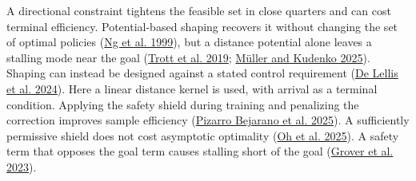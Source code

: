 \documentclass[10pt,letterpaper]{article}
\newcommand{\citl}[2]{(\hyperlink{ref:#1}{#2})}
\newcommand{\citm}[1]{(#1)}
\newcommand{\cl}[2]{\hyperlink{ref:#1}{#2}}
\begin{document}
A directional constraint tightens the feasible set in close quarters and can cost
terminal efficiency. Potential-based shaping recovers it without changing the set of
optimal policies \citl{ng1999}{Ng et al. 1999}, but a distance potential alone leaves a
stalling mode near the goal \citm{\cl{trott2019}{Trott et al. 2019};
\cl{mller2025}{M\"uller and Kudenko 2025}}. Shaping can instead be designed against a
stated control requirement \citl{de2024}{De Lellis et al. 2024}. Here a linear distance
kernel is used, with arrival as a terminal condition. Applying the safety shield during training and penalizing the correction improves sample
efficiency \citl{pizarro2025}{Pizarro Bejarano et al. 2025}. A sufficiently permissive
shield does not cost asymptotic optimality \citl{oh2025}{Oh et al. 2025}. A safety term
that opposes the goal term causes stalling short of the goal \citl{grover2023}{Grover et
al. 2023}.
\end{document}
